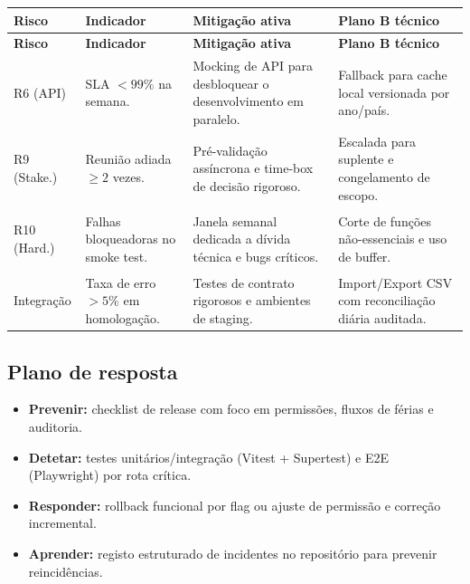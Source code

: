 \documentclass[11pt,a4paper,twoside]{article}
\newcommand{\tH}[1]{\textbf{\sffamily\small\color{white}#1}}
\newcommand{\theadrow}{\rowcolor{ACCENT}}
\begin{document}
\begin{longtable}{>{\small\bfseries}p{1.6cm} >{\small\raggedright\arraybackslash}p{3.5cm} >{\small\raggedright\arraybackslash}p{4.6cm} >{\small\raggedright\arraybackslash}p{4.5cm}}
\theadrow
\tH{Risco} & \tH{Indicador} & \tH{Mitigação ativa} & \tH{Plano B técnico} \\
\midrule
\endfirsthead
\theadrow
\tH{Risco} & \tH{Indicador} & \tH{Mitigação ativa} & \tH{Plano B técnico} \\
\midrule
\endhead

R6 (API) & SLA $<99\%$ na semana. & Mocking de API para desbloquear o desenvolvimento em paralelo. & Fallback para cache local versionada por ano/país. \\ \addlinespace[4pt]

R9 (Stake.) & Reunião adiada $\geq 2$ vezes. & Pré-validação assíncrona e time-box de decisão rigoroso. & Escalada para suplente e congelamento de escopo. \\ \addlinespace[4pt]

R10 (Hard.) & Falhas bloqueadoras no smoke test. & Janela semanal dedicada a dívida técnica e bugs críticos. & Corte de funções não-essenciais e uso de buffer. \\ \addlinespace[4pt]

Integração & Taxa de erro $>5\%$ em homologação. & Testes de contrato rigorosos e ambientes de staging. & Import/Export CSV com reconciliação diária auditada. \\
\bottomrule
\end{longtable}

\subsection{Plano de resposta}

\begin{itemize}
  \item \textbf{Prevenir:} checklist de release com foco em permissões, fluxos de férias e auditoria.
  \item \textbf{Detetar:} testes unitários/integração (Vitest + Supertest) e E2E (Playwright) por rota crítica.
  \item \textbf{Responder:} rollback funcional por flag ou ajuste de permissão e correção incremental.
  \item \textbf{Aprender:} registo estruturado de incidentes no repositório para prevenir reincidências.
\end{itemize}
\end{document}
